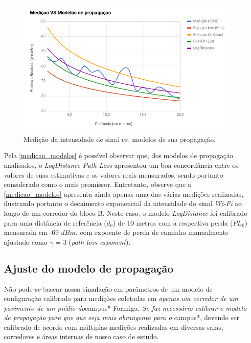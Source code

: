 \documentclass[
	12pt,				%
	twoside,			%
	a4paper,			%
	english,			%
	french,				%
	spanish,			%
	brazil				%
	]{abntex2}
\begin{document}
\begin{figure}[htb]
    \caption{\label{medicao_modelos} Medição da intensidade de sinal $vs.$ modelos de sua propagação.}
    \begin{center}
        \includegraphics[scale=0.68]{imagens/medicao-modelos.jpg}
    \end{center}
\end{figure}

Pela \autoref{medicao_modelos} é possível observar que, dos modelos de
propagação analisados, o \emph{LogDistance Path Loss} apresentou um boa
concordância entre os valores de suas estimativas e os valores reais
mensurados, sendo portanto considerado como o mais promissor.
Entretanto, observe que a \autoref{medicao_modelos} apresenta ainda
apenas uma das várias medições realizadas, ilustrando portanto o
decaimento exponencial da intensidade do sinal \emph{Wi-Fi} ao longo de
um corredor do bloco B. Neste caso, o modelo \emph{LogDistance} foi
calibrado para uma distância de referência (\(d_{0}\)) de 10 metros com
a respectiva perda (\(PL_{0}\)) mensurada em -69 \(dBm\), com expoente
de perda de caminho manualmente ajustado como \(\gamma\) = 3 (\emph{path
loss exponent}).

\subsection{Ajuste do modelo de
propagação}\label{ajuste-do-modelo-de-propagauxe7uxe3o}

Não pode-se basear nossa simulação em parâmetros de um modelo de
configuração calibrado para medições coletadas em \emph{apenas um
corredor de um pavimento de um prédio do}campus* Formiga\emph{. Se faz
necessário calibrar o modelo de propagação para que que seja mais
abrangente para o }campus*, devendo ser calibrado de acordo com
múltiplas medições realizadas em diversas salas, corredores e áreas
internas de nosso caso de estudo.
\end{document}
